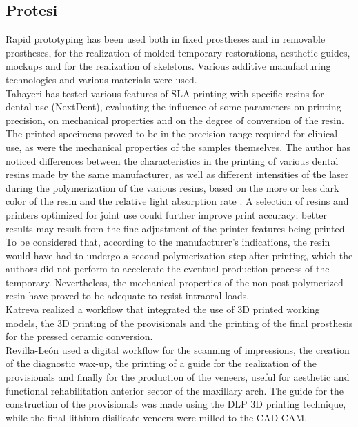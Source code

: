 \subsection{Protesi}
Rapid prototyping has been used both in fixed prostheses and in removable prostheses, for the realization of molded temporary restorations, aesthetic guides, mockups and for the realization of skeletons. Various additive manufacturing technologies and various materials were used. \\
Tahayeri \parencite{Reference98} has tested various features of SLA printing with specific resins for dental use (NextDent), evaluating the influence of some parameters on printing precision, on mechanical properties and on the degree of conversion of the resin. The printed specimens proved to be in the precision range required for clinical use, as were the mechanical properties of the samples themselves. The author has noticed differences between the characteristics in the printing of various dental resins made by the same manufacturer, as well as different intensities of the laser during the polymerization of the various resins, based on the more or less dark color of the resin and the relative light absorption rate . A selection of resins and printers optimized for joint use could further improve print accuracy; better results may result from the fine adjustment of the printer features being printed.
To be considered that, according to the manufacturer's indications, the resin would have had to undergo a second polymerization step after printing, which the authors did not perform to accelerate the eventual production process of the temporary. Nevertheless, the mechanical properties of the non-post-polymerized resin have proved to be adequate to resist intraoral loads. \\
Katreva \parencite{Reference99} realized a workflow that integrated the use of 3D printed working models, the 3D printing of the provisionals and the printing of the final prosthesis for the pressed ceramic conversion. \\
Revilla-León \parencite{Reference100} used a digital workflow for the scanning of impressions, the creation of the diagnostic wax-up, the printing of a guide for the realization of the provisionals and finally for the production of the veneers, useful for aesthetic and functional rehabilitation anterior sector of the maxillary arch. The guide for the construction of the provisionals was made using the DLP 3D printing technique, while the final lithium disilicate veneers were milled to the CAD-CAM. \\
